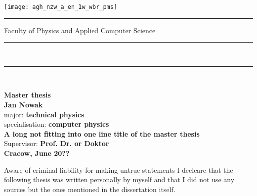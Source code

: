 \documentclass[a4paper,12pt]{article}
\begin{document}

\thispagestyle{empty}
\texttt{[image: agh\_nzw\_a\_en\_1w\_wbr\_pms]}\\
\rule{30mm}{0pt}{
{\large \textsf{Faculty of Physics and Applied Computer Science}}\\
\rule{\textwidth}{3pt}\\
\rule[2ex]
{\textwidth}{1pt}\\
\vspace{7ex}
\begin{center}
{\LARGE \bf \textsf{Master thesis}}\\
\vspace{13ex}
{\bf \Large \textsf{Jan Nowak}}\\
\vspace{3ex}
{\small \sf major: {\bf \textsf{technical physics}}}\\
\vspace{1.5ex}
{\small \sf specialisation: {\bf \textsf{computer physics}}}\\
\vspace{10ex}
{\bf \huge \textsf{A long not fitting
into one line title
of the master thesis}}\\
\vspace{14ex}
{\Large \sf Supervisor: {\bf \textsf{Prof. Dr. or Doktor}}}\\
\vspace{22ex}
{\large \bf \textsf{Cracow, June 20??}}
\end{center}

\newpage

Aware of criminal liability for making untrue statements I decleare that
the following thesis was written personally by myself and that I did not use
any sources but the ones mentioned in the dissertation itself.

\newpage

}
\end{document}
